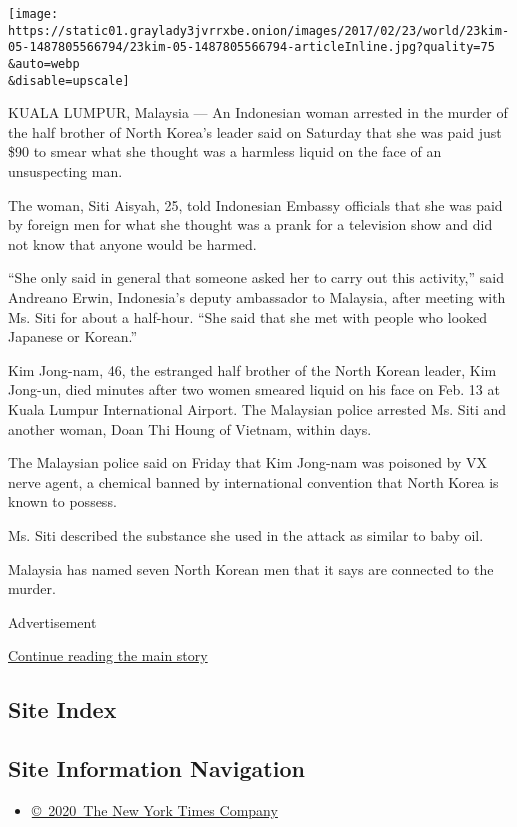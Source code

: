 \texttt{[image: https://static01.graylady3jvrrxbe.onion/images/2017/02/23/world/23kim-05-1487805566794/23kim-05-1487805566794-articleInline.jpg?quality=75\\\&auto=webp\\\&disable=upscale]}

KUALA LUMPUR, Malaysia --- An Indonesian woman arrested in the murder of
the half brother of North Korea's leader said on Saturday that she was
paid just \$90 to smear what she thought was a harmless liquid on the
face of an unsuspecting man.

The woman, Siti Aisyah, 25, told Indonesian Embassy officials that she
was paid by foreign men for what she thought was a prank for a
television show and did not know that anyone would be harmed.

``She only said in general that someone asked her to carry out this
activity,'' said Andreano Erwin, Indonesia's deputy ambassador to
Malaysia, after meeting with Ms. Siti for about a half-hour. ``She said
that she met with people who looked Japanese or Korean.''

Kim Jong-nam, 46, the estranged half brother of the North Korean leader,
Kim Jong-un, died minutes after two women smeared liquid on his face on
Feb. 13 at Kuala Lumpur International Airport. The Malaysian police
arrested Ms. Siti and another woman, Doan Thi Houng of Vietnam, within
days.

The Malaysian police said on Friday that Kim Jong-nam was poisoned by VX
nerve agent, a chemical banned by international convention that North
Korea is known to possess.

Ms. Siti described the substance she used in the attack as similar to
baby oil.

Malaysia has named seven North Korean men that it says are connected to
the murder.

Advertisement

\protect\hyperlink{after-bottom}{Continue reading the main story}

\hypertarget{site-index}{%
\subsection{Site Index}\label{site-index}}

\hypertarget{site-information-navigation}{%
\subsection{Site Information
Navigation}\label{site-information-navigation}}

\begin{itemize}
\tightlist
\item
  \href{https://help.nytimes3xbfgragh.onion/hc/en-us/articles/115014792127-Copyright-notice}{©~2020~The
  New York Times Company}
\end{itemize}

